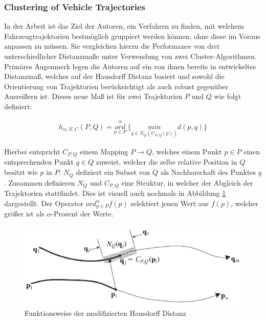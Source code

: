 \subsubsection*{Clustering of Vehicle Trajectories}
\label{sec:atev_et_al}
In der Arbeit \cite[]{Atev2010} ist das Ziel der Autoren, ein Verfahren zu finden, mit welchem Fahrzeugtrajektorien
bestmöglich gruppiert werden können, ohne diese im Voraus anpassen zu müssen.
Sie vergleichen hierzu die Performance von drei unterschiedlicher Distanzmaße unter Verwendung von zwei Cluster-Algorithmen.
Primäres Augenmerk legen die Autoren auf ein von ihnen bereits in \cite[]{Atev2006} entwickeltes Distanzmaß,
welches auf der Hausdorff Distanz basiert und sowohl die Orientierung von Trajektorien berücksichtigt
als auch robust gegenüber Ausreißern ist. Dieses neue Maß ist für zwei Trajektorien $P$ und $Q$
wie folgt definiert:

\begin{ceqn}
\begin{align}
\label{eq_modHausdorff}
    h_{\alpha, N, C}(P, Q) = \overset{\alpha}{\underset{p \in P}{ord}}\ \Big\{ \underset{q \in N_Q(C_{P,Q}(p))}{min} d(p, q) \Big\}
\end{align}
\end{ceqn}

Hierbei entspricht $C_{P,Q}$ einem Mapping $P \rightarrow Q$, welches einem Punkt $p \in P$ einen entsprechenden
Punkt $q \in Q$ zuweist, welcher die selbe relative Position in $Q$ besitzt wie $p$ in $P$.
$N_Q$ definiert ein Subset von $Q$ als Nachbarschaft des Punktes $q$. Zusammen definieren $N_Q$ und $C_{P,Q}$ eine
Struktur, in welcher der Abgleich der Trajektorien stattfindet. Dies ist visuell auch nochmals in Abbildung
\ref{fig:relw_atev_modh} dargestellt. Der Operator $ord_{p \in P}^{\alpha} f(p)$ selektiert jenen Wert aus $f(p)$, welcher
größer ist als $\alpha$-Prozent der Werte.

\begin{figure}[H]
    \centering
    \includegraphics[width=0.6\linewidth]{../resources/img/RelatedWork/Atev_modHausdorff}
    \caption[Funktionsweise der modifizierten Hausdorff Distanz]{Funktionsweise der modifizierten Hausdorff Distanz \cite[]{Atev2010}}
    \label{fig:relw_atev_modh}
\end{figure}

